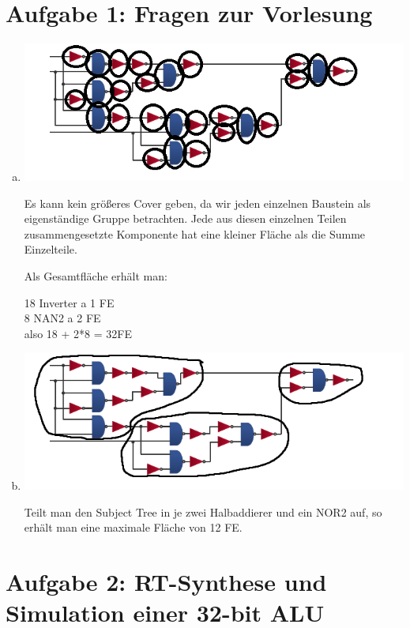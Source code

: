 \documentclass[a4paper]{scrartcl}
\begin{document}
	
	\section*{Aufgabe 1: Fragen zur Vorlesung}
	
	\begin{enumerate}[(a)]
		\item \hfill
		
		\includegraphics[scale=1]{1_subject_tree_max_cover}
		
		Es kann kein größeres Cover geben, da wir jeden einzelnen Baustein als eigenständige Gruppe betrachten. Jede aus diesen einzelnen Teilen zusammengesetzte Komponente hat eine kleiner Fläche als die Summe Einzelteile.
		
		Als Gesamtfläche erhält man:
		
		18 Inverter a 1 FE\\
		8 NAN2 a 2 FE\\
		
		also 18 + 2*8 = 32FE
		
		\item \hfill
		
		\includegraphics[scale=1]{1_subject_tree_12_cover}
		
		Teilt man den Subject Tree in je zwei Halbaddierer und ein NOR2 auf, so erhält man eine maximale Fläche von 12 FE.
		
	\end{enumerate}
	\newpage
	\section*{Aufgabe 2: RT-Synthese und Simulation einer 32-bit ALU}
	
\end{document}
